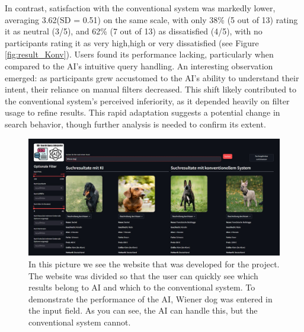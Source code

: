 \documentclass[../../submission.tex]{subfiles}
\begin{document}
In contrast, satisfaction with the conventional 
system was markedly lower, averaging 3.62(SD = 0.51) on the same scale, with only 38\% (5 out of 13) rating it as neutral (3/5), and 62\% 
(7 out of 13) as dissatisfied (4/5), with no participants rating it as very high,high or 
very dissatisfied (see Figure \ref{fig:result_Konv}). Users found its performance lacking, particularly when compared to the AI’s 
intuitive query handling. An interesting observation emerged: as participants grew 
accustomed to the AI’s ability to understand their intent, their reliance on manual 
filters decreased. This shift likely contributed to the conventional system’s perceived 
inferiority, as it depended heavily on filter usage to refine results. This rapid 
adaptation suggests a potential change in search behavior, though further analysis is 
needed to confirm its extent.


\begin{figure}[h]
    \includegraphics[width=\textwidth]{images/wiener_dog}
    \caption{In this picture we see the website that was developed for the project. The website was divided so that the user can quickly see which results belong to AI and which to the conventional system. To demonstrate the performance of the AI, Wiener dog was entered in the input field. As you can see, the AI can handle this, but the conventional system cannot.}
    \Description{}
    \label{fig:wiener_dog}
 \end{figure} 
\end{document}
